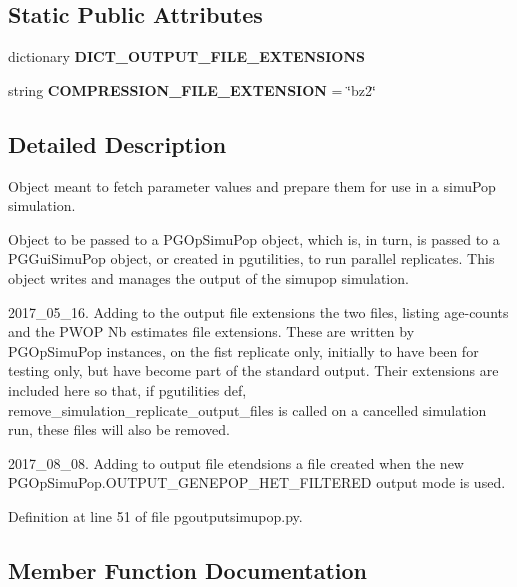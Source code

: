 \subsection*{Static Public Attributes}
\begin{DoxyCompactItemize}
\item 
dictionary {\bfseries D\+I\+C\+T\+\_\+\+O\+U\+T\+P\+U\+T\+\_\+\+F\+I\+L\+E\+\_\+\+E\+X\+T\+E\+N\+S\+I\+O\+NS}
\item 
string {\bfseries C\+O\+M\+P\+R\+E\+S\+S\+I\+O\+N\+\_\+\+F\+I\+L\+E\+\_\+\+E\+X\+T\+E\+N\+S\+I\+ON} = \char`\"{}bz2\char`\"{}\hypertarget{classnegui_1_1pgoutputsimupop_1_1PGOutputSimuPop_aaf295d98adb01d86781790b5a57c5348}{}\label{classnegui_1_1pgoutputsimupop_1_1PGOutputSimuPop_aaf295d98adb01d86781790b5a57c5348}

\end{DoxyCompactItemize}


\subsection{Detailed Description}
\begin{DoxyVerb}Object meant to fetch parameter values and prepare them for 
use in a simuPop simulation.  

Object to be passed to a PGOpSimuPop object, which is, in turn,
is passed to a PGGuiSimuPop object, or created in pgutilities,
to run parallel replicates.  This object writes and manages the
output of the simupop simulation. 

2017_05_16.  Adding to the output file extensions the two files,
listing age-counts and the PWOP Nb estimates file extensions.
These are written by PGOpSimuPop instances, on the fist replicate
only, initially to have been for testing only, but have become
part of the standard output.  Their extensions are included here
so that, if pgutilities def, remove_simulation_replicate_output_files
is called on a cancelled simulation run, these files will also
be removed.


2017_08_08.  Adding to output file etendsions a file created when
the new PGOpSimuPop.OUTPUT_GENEPOP_HET_FILTERED output mode is used.
\end{DoxyVerb}
 

Definition at line 51 of file pgoutputsimupop.\+py.



\subsection{Member Function Documentation}

